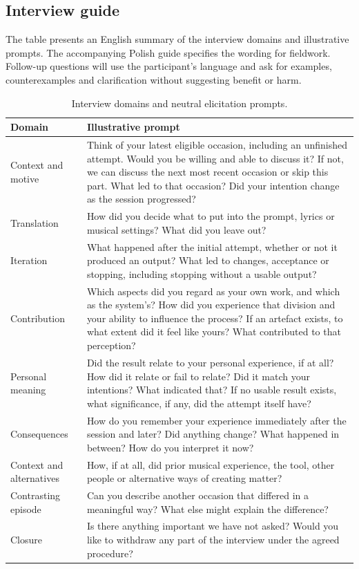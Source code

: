 \subsection{Interview guide}
The table presents an English summary of the interview domains and illustrative prompts. The accompanying Polish guide specifies the wording for fieldwork. Follow-up questions will use the participant's language and ask for examples, counterexamples and clarification without suggesting benefit or harm.

\begin{table}[htbp]
\centering\small
\caption{Interview domains and neutral elicitation prompts.}
\label{tab:interview}
\begin{tabularx}{\linewidth}{@{}p{.23\linewidth}X@{}}
\toprule
Domain & Illustrative prompt \\
\midrule
Context and motive & Think of your latest eligible occasion, including an unfinished attempt. Would you be willing and able to discuss it? If not, we can discuss the next most recent occasion or skip this part. What led to that occasion? Did your intention change as the session progressed? \\
Translation & How did you decide what to put into the prompt, lyrics or musical settings? What did you leave out? \\
Iteration & What happened after the initial attempt, whether or not it produced an output? What led to changes, acceptance or stopping, including stopping without a usable output? \\
Contribution & Which aspects did you regard as your own work, and which as the system's? How did you experience that division and your ability to influence the process? If an artefact exists, to what extent did it feel like yours? What contributed to that perception? \\
Personal meaning & Did the result relate to your personal experience, if at all? How did it relate or fail to relate? Did it match your intentions? What indicated that? If no usable result exists, what significance, if any, did the attempt itself have? \\
Consequences & How do you remember your experience immediately after the session and later? Did anything change? What happened in between? How do you interpret it now? \\
Context and alternatives & How, if at all, did prior musical experience, the tool, other people or alternative ways of creating matter? \\
Contrasting episode & Can you describe another occasion that differed in a meaningful way? What else might explain the difference? \\
Closure & Is there anything important we have not asked? Would you like to withdraw any part of the interview under the agreed procedure? \\
\bottomrule
\end{tabularx}
\end{table}
